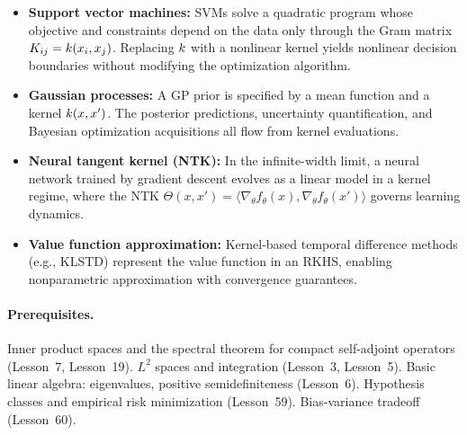 \documentclass[11pt,a4paper]{article}
\begin{document}
\begin{rlconnection}[title={Why Kernel Methods Matter for RL/ML}]
\begin{itemize}[nosep]
    \item \textbf{Support vector machines:} SVMs solve a quadratic
    program whose objective and constraints depend on the data only
    through the Gram matrix $K_{ij} = k(x_i, x_j)$. Replacing
    $k$ with a nonlinear kernel yields nonlinear decision
    boundaries without modifying the optimization algorithm.
    \item \textbf{Gaussian processes:} A GP prior is specified by a
    mean function and a kernel $k(x, x')$. The posterior
    predictions, uncertainty quantification, and Bayesian optimization
    acquisitions all flow from kernel evaluations.
    \item \textbf{Neural tangent kernel (NTK):} In the infinite-width
    limit, a neural network trained by gradient descent evolves as a
    linear model in a kernel regime, where the NTK
    $\Theta(x, x') = \langle \nabla_\theta f_\theta(x),
    \nabla_\theta f_\theta(x') \rangle$ governs learning dynamics.
    \item \textbf{Value function approximation:} Kernel-based
    temporal difference methods (e.g., KLSTD) represent the value
    function in an RKHS, enabling nonparametric approximation with
    convergence guarantees.
\end{itemize}
\end{rlconnection}

\paragraph{Prerequisites.}
Inner product spaces and the spectral theorem for compact
self-adjoint operators (Lesson~7, Lesson~19). $L^2$ spaces and
integration (Lesson~3, Lesson~5). Basic linear algebra: eigenvalues,
positive semidefiniteness (Lesson~6). Hypothesis classes and
empirical risk minimization (Lesson~59). Bias-variance tradeoff
(Lesson~60).
\end{document}

